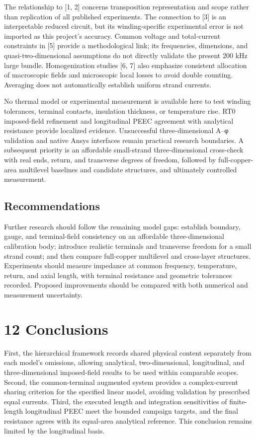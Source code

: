 \documentclass[11pt]{article}
\begin{document}
The relationship to [1, 2] concerns transposition representation and scope rather than replication of all published experiments. The connection to [3] is an interpretable reduced circuit, but its winding-specific experimental error is not imported as this project’s accuracy. Common voltage and total-current constraints in [5] provide a methodological link; its frequencies, dimensions, and quasi-two-dimensional assumptions do not directly validate the present 200 kHz large bundle. Homogenization studies [6, 7] also emphasize consistent allocation of macroscopic fields and microscopic local losses to avoid double counting. Averaging does not automatically establish uniform strand currents.


No thermal model or experimental measurement is available here to test winding tolerances, terminal contacts, insulation thickness, or temperature rise. RT0 imposed-field refinement and longitudinal PEEC agreement with analytical resistance provide localized evidence. Unsuccessful three-dimensional A–φ validation and native Ansys interfaces remain practical research boundaries. A subsequent priority is an affordable small-strand three-dimensional cross-check with real ends, return, and transverse degrees of freedom, followed by full-copper-area multilevel baselines and candidate structures, and ultimately controlled measurement.


\subsection*{Recommendations}
\hypertarget{11.recommendations.heading}{}
Further research should follow the remaining model gaps: establish boundary, gauge, and terminal-field consistency on an affordable three-dimensional calibration body; introduce realistic terminals and transverse freedom for a small strand count; and then compare full-copper multilevel and cross-layer structures. Experiments should measure impedance at common frequency, temperature, return, and axial length, with terminal resistance and geometric tolerances recorded. Proposed improvements should be compared with both numerical and measurement uncertainty.


\FloatBarrier
\section*{12 Conclusions}
\hypertarget{chapter-12}{}
First, the hierarchical framework records shared physical content separately from each model’s omissions, allowing analytical, two-dimensional, longitudinal, and three-dimensional imposed-field results to be used within comparable scopes. Second, the common-terminal augmented system provides a complex-current sharing criterion for the specified linear model, avoiding validation by prescribed equal currents. Third, the executed length and integration sensitivities of finite-length longitudinal PEEC meet the bounded campaign targets, and the final resistance agrees with its equal-area analytical reference. This conclusion remains limited by the longitudinal basis.
\end{document}
